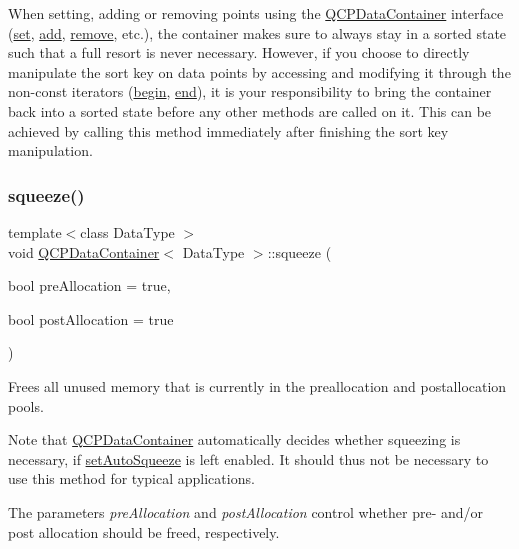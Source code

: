 When setting, adding or removing points using the \hyperlink{class_q_c_p_data_container}{Q\+C\+P\+Data\+Container} interface (\hyperlink{class_q_c_p_data_container_ae7042bd534fc3ce7befa2ce3f790b5bf}{set}, \hyperlink{class_q_c_p_data_container_a42b98bd994307ccd163a43d576f91ad9}{add}, \hyperlink{class_q_c_p_data_container_ae5f569a120648b167efa78835f12fd38}{remove}, etc.), the container makes sure to always stay in a sorted state such that a full resort is never necessary. However, if you choose to directly manipulate the sort key on data points by accessing and modifying it through the non-\/const iterators (\hyperlink{class_q_c_p_data_container_a80032518413ab8f418f7c81182fd06cb}{begin}, \hyperlink{class_q_c_p_data_container_acf66dfad83fe041380f5e0491e7676f2}{end}), it is your responsibility to bring the container back into a sorted state before any other methods are called on it. This can be achieved by calling this method immediately after finishing the sort key manipulation. \mbox{\label{class_q_c_p_data_container_a82fcc511def22287fc62579d0706387c}} 
\subsubsection{\texorpdfstring{squeeze()}{squeeze()}}
{\footnotesize\ttfamily template$<$class Data\+Type $>$ \\
void \hyperlink{class_q_c_p_data_container}{Q\+C\+P\+Data\+Container}$<$ Data\+Type $>$\+::squeeze (\begin{DoxyParamCaption}\item[{bool}]{pre\+Allocation = {\ttfamily true},  }\item[{bool}]{post\+Allocation = {\ttfamily true} }\end{DoxyParamCaption})}

Frees all unused memory that is currently in the preallocation and postallocation pools.

Note that \hyperlink{class_q_c_p_data_container}{Q\+C\+P\+Data\+Container} automatically decides whether squeezing is necessary, if \hyperlink{class_q_c_p_data_container_a233f866760a78950d2a393c1a4bc54b5}{set\+Auto\+Squeeze} is left enabled. It should thus not be necessary to use this method for typical applications.

The parameters {\itshape pre\+Allocation} and {\itshape post\+Allocation} control whether pre-\/ and/or post allocation should be freed, respectively. \mbox{\label{class_q_c_p_data_container_a35a102dc2424d1228fc374d9313efbe9}} 
